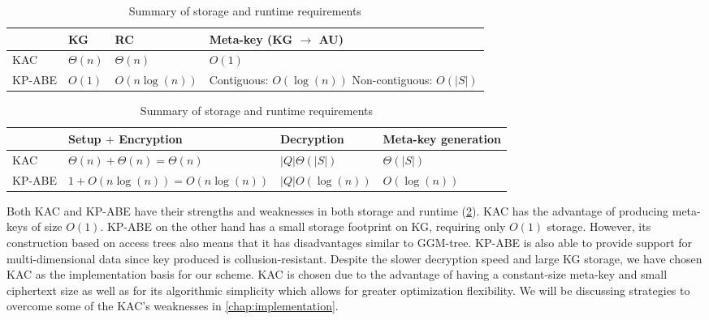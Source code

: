\documentclass[hyp,a4paper,12pt,openbib]{socreport}
\begin{document}
\begin{table}[h]
\centering
\begin{subtable}{1\textwidth}
\centering
    \begin{tabular}{|l|l|l| p{}|}
    \hline
    ~      & KG     & RC            & Meta-key (KG $\to$ AU)                                    \\ \hline
    KAC    & $\Theta(n)$ & $\Theta(n)$        & $O(1)$                                                    \\ \hline
    KP-ABE & $O(1)$ & $O(n\log(n))$ & Contiguous: $O(\log(n))$ \newline Non-contiguous: $O(|S|)$ \\ \hline
    \end{tabular}
    \caption{Storage}
\end{subtable}
\begin{subtable}{1\textwidth}
\centering
    \begin{tabular}{|l|l|l|l|}
    \hline
    ~      & Setup $+$ Encryption                & Decryption       & Meta-key generation \\ \hline
    KAC    & $\Theta(n) + \Theta(n) = \Theta(n)$ & $|Q|\Theta(|S|)$ & $\Theta(|S|)$       \\ \hline
    KP-ABE & $1 + O(n\log(n)) = O(n\log(n))$     & $|Q|O(\log(n))$   & $O(\log(n))$         \\ \hline
    \end{tabular}
       \caption{Runtime}
     \end{subtable}
    \caption{Summary of storage and runtime requirements}
    \label{tab:summary}
\end{table}

Both KAC and KP-ABE have their strengths and weaknesses in both storage and runtime (\cref{tab:summary}). KAC has the advantage of producing meta-keys of size $O(1)$. KP-ABE on the other hand has a small storage footprint on KG, requiring only $O(1)$ storage. However, its construction based on access trees also means that it has disadvantages similar to GGM-tree. KP-ABE is also able to provide support for multi-dimensional data since key produced is collusion-resistant. Despite the slower decryption speed and large KG storage, we have chosen KAC as the implementation basis for our scheme. KAC is chosen due to the advantage of having a constant-size meta-key and small ciphertext size as well as for its algorithmic simplicity which allows for greater optimization flexibility. We will be discussing strategies to overcome some of the KAC's weaknesses in \cref{chap:implementation}.
\end{document}
